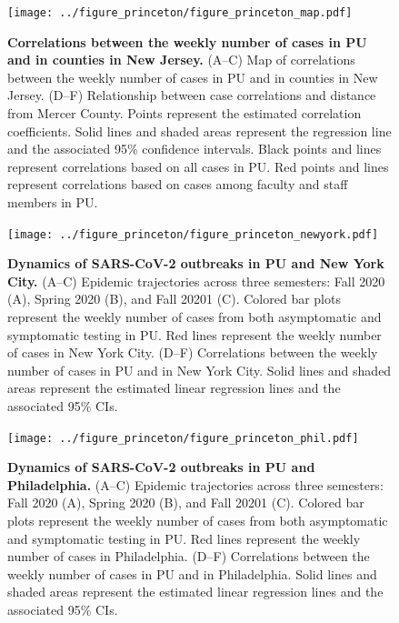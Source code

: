 \documentclass[12pt]{article}
\begin{document}
\pagebreak


\begin{figure}[!htp]
\begin{center}
\texttt{[image: ../figure\_princeton/figure\_princeton\_map.pdf]}
\end{center}
\caption{
\textbf{Correlations between the weekly number of cases in PU and in counties in New Jersey.}
(A--C) Map of correlations between the weekly number of cases in PU and in counties in New Jersey.
(D--F) Relationship between case correlations and distance from Mercer County.
Points represent the estimated correlation coefficients.
Solid lines and shaded areas represent the regression line and the associated 95\% confidence intervals.
Black points and lines represent correlations based on all cases in PU.
Red points and lines represent correlations based on cases among faculty and staff members in PU.
}
\end{figure}


\pagebreak

\begin{figure}[!htp]
\texttt{[image: ../figure\_princeton/figure\_princeton\_newyork.pdf]}
\caption{
\textbf{Dynamics of SARS-CoV-2 outbreaks in PU and New York City.}
(A--C) Epidemic trajectories across three semesters: Fall 2020 (A), Spring 2020 (B), and Fall 20201 (C).
Colored bar plots represent the weekly number of cases from both asymptomatic and symptomatic testing in PU.
Red lines represent the weekly number of cases in New York City.
(D--F) Correlations between the weekly number of cases in PU and in New York City.
Solid lines and shaded areas represent the estimated linear regression lines and the associated 95\% CIs.
}
\end{figure}


\pagebreak

\begin{figure}[!htp]
\texttt{[image: ../figure\_princeton/figure\_princeton\_phil.pdf]}
\caption{
\textbf{Dynamics of SARS-CoV-2 outbreaks in PU and Philadelphia.}
(A--C) Epidemic trajectories across three semesters: Fall 2020 (A), Spring 2020 (B), and Fall 20201 (C).
Colored bar plots represent the weekly number of cases from both asymptomatic and symptomatic testing in PU.
Red lines represent the weekly number of cases in Philadelphia.
(D--F) Correlations between the weekly number of cases in PU and in Philadelphia.
Solid lines and shaded areas represent the estimated linear regression lines and the associated 95\% CIs.
}
\end{figure}
\end{document}
